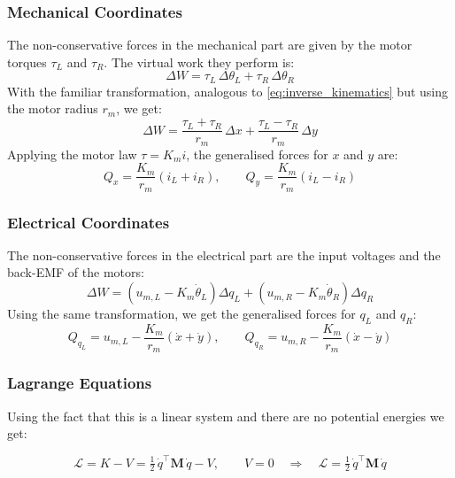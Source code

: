 \subsubsection*{Mechanical Coordinates}
The non-conservative forces in the mechanical part are given by the motor torques $\tau_L$ and $\tau_R$. The virtual work they perform is:
\begin{equation*}
\Delta W = \tau_L\,\Delta\theta_L + \tau_R\,\Delta\theta_R
\end{equation*}
With the familiar transformation, analogous to \eqref{eq:inverse_kinematics} but using the motor radius $r_m$, we get:
\begin{equation*}
\Delta W = \frac{\tau_L + \tau_R}{r_m}\,\Delta x + \frac{\tau_L - \tau_R}{r_m}\,\Delta y
\end{equation*}
Applying the motor law $\tau = K_m i$, the generalised forces for $x$ and $y$ are:
\begin{equation}
\label{eq:gen_force_mech}
Q_x = \frac{K_m}{r_m}\left(i_L + i_R\right),
\qquad
Q_y = \frac{K_m}{r_m}\left(i_L - i_R\right)
\end{equation}

\subsubsection*{Electrical Coordinates}
The non-conservative forces in the electrical part are the input voltages and the back-EMF of the motors:
\begin{equation*}
\Delta W = \left(u_{m,L} - K_m\dot\theta_L\right)\Delta q_L + \left(u_{m,R} - K_m\dot\theta_R\right)\Delta q_R
\end{equation*}
Using the same transformation, we get the generalised forces for $q_L$ and $q_R$:
\begin{equation}
\label{eq:gen_force_el}
Q_{q_L} = u_{m,L} - \frac{K_m}{r_m}\left(\dot x + \dot y\right),
\qquad
Q_{q_R} = u_{m,R} - \frac{K_m}{r_m}\left(\dot x - \dot y\right)
\end{equation}

\subsubsection*{Lagrange Equations}
Using the fact that this is a linear system and there are no potential energies we get:


\begin{equation*}
\mathcal{L} = K - V = \tfrac{1}{2}\,\dot q^\top \mathbf{M}\,\dot q - V,
\qquad V = 0
\quad\Rightarrow\quad
\mathcal{L} = \tfrac{1}{2}\,\dot q^\top \mathbf{M}\,\dot q
\end{equation*}


